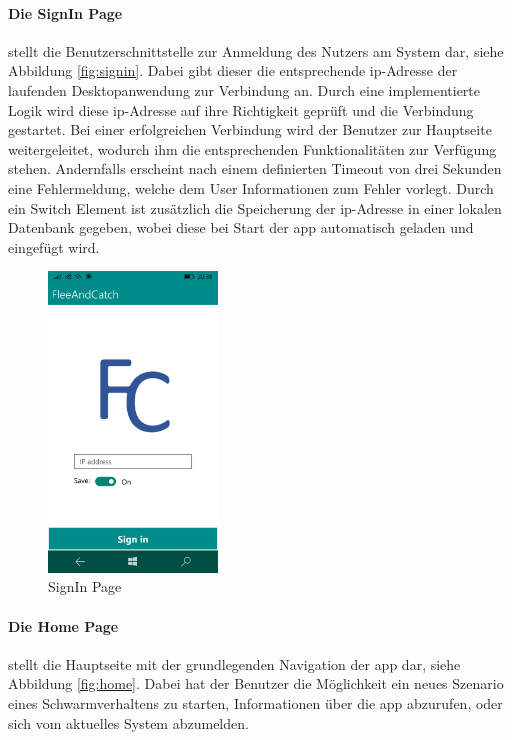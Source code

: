 \paragraph{Die SignIn Page} stellt die Benutzerschnittstelle zur Anmeldung des Nutzers am System dar, siehe Abbildung \eqref{fig:signin}. Dabei gibt dieser die entsprechende \gls{ip}-Adresse der laufenden Desktopanwendung zur Verbindung an. Durch eine implementierte Logik wird diese \gls{ip}-Adresse auf ihre Richtigkeit geprüft und die Verbindung gestartet. Bei einer erfolgreichen Verbindung wird der Benutzer zur Hauptseite weitergeleitet, wodurch ihm die entsprechenden Funktionalitäten zur Verfügung stehen. Andernfalls erscheint nach einem definierten Timeout von drei Sekunden eine Fehlermeldung, welche dem User Informationen zum Fehler vorlegt. Durch ein Switch Element ist zusätzlich die Speicherung der \gls{ip}-Adresse in einer lokalen Datenbank gegeben, wobei diese bei Start der \gls{app} automatisch geladen und eingefügt wird.\\

\begin{figure}[h]
	\begin{center}
		\includegraphics[width=0.4\textwidth]{images/implementation/signin.png}
	\end{center}	
	\caption{SignIn Page}
	\label{fig:signin}
\end{figure}

\newpage
\paragraph{Die Home Page} stellt die Hauptseite mit der grundlegenden Navigation der \gls{app} dar, siehe Abbildung \eqref{fig:home}. Dabei hat der Benutzer die Möglichkeit ein neues Szenario eines Schwarmverhaltens zu starten, Informationen über die \gls{app} abzurufen, oder sich vom aktuelles System abzumelden.

